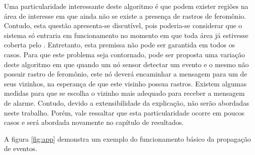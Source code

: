 Uma particularidade interessante deste algoritmo é que podem exister regiões na área de interesse em que ainda não se existe a presença de rastros de feromônio. Contudo, esta questão apresenta-se discutível, pois poderia-se considerar que o sistema só entraria em funcionamento no momento em que toda área já estivesse coberta pelo \vant. Entretanto, esta premissa não pode ser garantida em todos os casos. Para que este problema seja contornado, pode ser proposta uma variação deste algoritmo em que quando um nó sensor detectar um evento e o mesmo não possuir rastro de feromônio, este nó deverá encaminhar a mensagem para um de seus vizinhos, na esperança de que este visinho possua rastros. Existem algumas medidas para que se escolha o vizinho mais adequado para receber a mensagem de alarme. Contudo, devido a extensibilidade da explicação, não serão abordadas neste trabalho. Porém, vale ressaltar que esta particularidade ocorre em poucos casos e será abordada novamente no capítulo de resultados.

 A figura \ref{fig:app} demonstra um exemplo do funcionamento básico da propagação de eventos.
 






